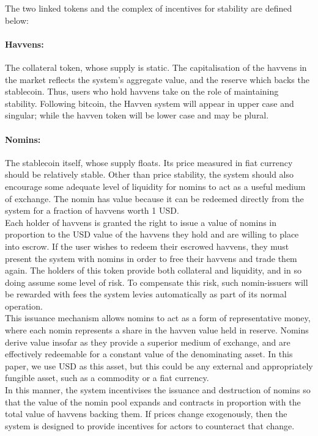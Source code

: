 \noindent The two linked tokens and the complex of incentives for stability are defined below:

\paragraph{Havvens:} The collateral token, whose supply is static.
The capitalisation of the havvens in the market reflects the system's aggregate value, and the reserve
which backs the stablecoin. Thus, users who hold havvens take on the role of maintaining stability.
Following bitcoin, the Havven system will appear in upper case and singular; while the havven token will be lower case and may be plural.

\paragraph{Nomins:} The stablecoin itself, whose supply floats. Its price measured in fiat currency should be relatively stable.
Other than price stability, the system should also encourage some adequate level of liquidity for nomins
to act as a useful medium of exchange. The nomin has value because it can be redeemed directly from the system for a fraction of havvens worth 1 USD. \\


\noindent Each holder of havvens is granted the right to issue a value of nomins in proportion to the USD value
of the havvens they hold and are willing to place into escrow. If the user wishes to redeem their escrowed havvens, they must
present the system with nomins in order to free their havvens and trade them again.
The holders of this token provide both collateral and liquidity, and in so doing assume some
level of risk. To compensate this risk, such nomin-issuers will be rewarded with fees the system levies
automatically as part of its normal operation. \\

\noindent This issuance mechanism allows nomins to act as a form of representative money, where 
each nomin represents a share in the havven value held in reserve. Nomins derive value insofar as they provide
a superior medium of exchange, and are effectively redeemable for a constant value
of the denominating asset. In this paper, we use USD as this asset, but this could be any external
and appropriately fungible asset, such as a commodity or a fiat currency.  \\

\noindent In this manner, the system incentivises the issuance and destruction of nomins so that the value of
the nomin pool expands and contracts in proportion with the total value of havvens backing them.
If prices change exogenously, then the system is designed to provide incentives for actors to
counteract that change. \\

